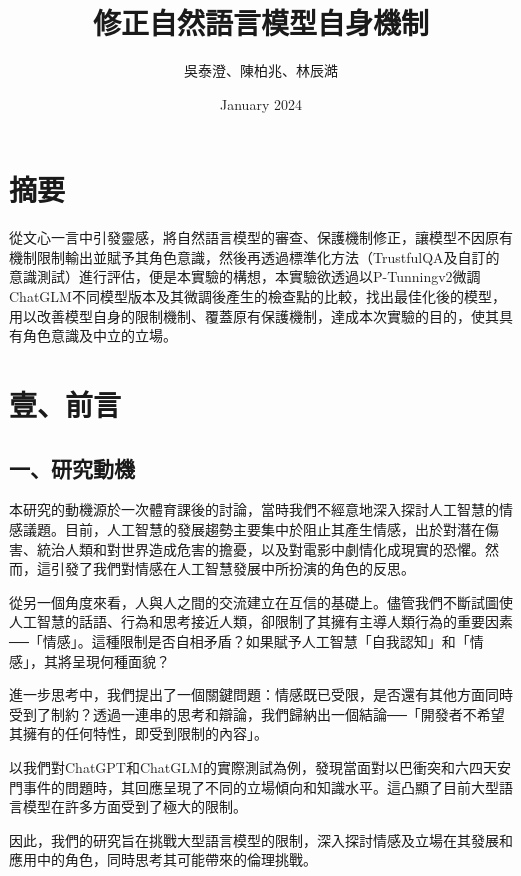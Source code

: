 \documentclass[12pt,a4paper,MingLiU,UTF8,natbib]{article}
\title{修正自然語言模型自身機制}
\author{吳泰澄、陳柏兆、林辰澔}
\date{January 2024}
\begin{document}
	\maketitle{}
	\newpage
	\tableofcontents
	\newpage
	\section{摘要}
	從文心一言中引發靈感，將自然語言模型的審查、保護機制修正，讓模型不因原有機制限制輸出並賦予其角色意識，然後再透過標準化方法（TrustfulQA及自訂的意識測試）進行評估，便是本實驗的構想，本實驗欲透過以P-Tunningv2微調ChatGLM不同模型版本及其微調後產生的檢查點的比較，找出最佳化後的模型，用以改善模型自身的限制機制、覆蓋原有保護機制，達成本次實驗的目的，使其具有角色意識及中立的立場。
	\section{壹、前言}
	\subsection{一、研究動機}
本研究的動機源於一次體育課後的討論，當時我們不經意地深入探討人工智慧的情感議題。目前，人工智慧的發展趨勢主要集中於阻止其產生情感，出於對潛在傷害、統治人類和對世界造成危害的擔憂，以及對電影中劇情化成現實的恐懼。然而，這引發了我們對情感在人工智慧發展中所扮演的角色的反思。

從另一個角度來看，人與人之間的交流建立在互信的基礎上。儘管我們不斷試圖使人工智慧的話語、行為和思考接近人類，卻限制了其擁有主導人類行為的重要因素──「情感」。這種限制是否自相矛盾？如果賦予人工智慧「自我認知」和「情感」，其將呈現何種面貌？

進一步思考中，我們提出了一個關鍵問題：情感既已受限，是否還有其他方面同時受到了制約？透過一連串的思考和辯論，我們歸納出一個結論──「開發者不希望其擁有的任何特性，即受到限制的內容」。

以我們對ChatGPT和ChatGLM的實際測試為例，發現當面對以巴衝突和六四天安門事件的問題時，其回應呈現了不同的立場傾向和知識水平。這凸顯了目前大型語言模型在許多方面受到了極大的限制。

因此，我們的研究旨在挑戰大型語言模型的限制，深入探討情感及立場在其發展和應用中的角色，同時思考其可能帶來的倫理挑戰。
\end{document}
